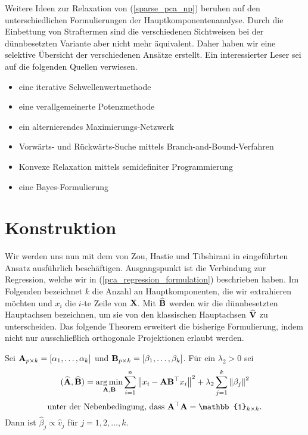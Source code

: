 Weitere Ideen zur Relaxation von (\ref{sparse_pca_np}) beruhen auf den unterschiedlichen Formulierungen der Hauptkomponentenanalyse. Durch die Einbettung von Straftermen sind die verschiedenen Sichtweisen bei der dünnbesetzten Variante aber nicht mehr äquivalent. Daher haben wir eine selektive Übersicht der verschiedenen Ansätze erstellt. Ein interessierter Leser sei auf die folgenden Quellen verwiesen.
\begin{itemize}
\item eine iterative Schwellenwertmethode \cite{shen, witten}
\item eine verallgemeinerte Potenzmethode \cite{journee}
\item ein alternierendes Maximierungs-Netzwerk \cite{richtarik}
\item Vorwärts- und Rückwärts-Suche mittels Branch-and-Bound-Verfahren \cite{moghaddam}
\item Konvexe Relaxation mittels semidefiniter Programmierung \cite{daspremont_semidefinite}
\item eine Bayes-Formulierung \cite{guan}
\end{itemize}




\section{Konstruktion}
\label{construction}

Wir werden uns nun mit dem von Zou, Hastie und Tibshirani in \cite{zou_sparsepca} eingeführten Ansatz ausführlich beschäftigen. Ausgangspunkt ist die Verbindung zur Regression, welche wir in (\ref{pca_regression_formulation}) beschrieben haben. Im Folgenden bezeichnet $k$ die Anzahl an Hauptkomponenten, die wir extrahieren möchten und $x_i$ die $i$-te Zeile von $\mathbf{X}$. Mit $\widehat{\mathbf{B}}$ werden wir die dünnbesetzten Hauptachsen bezeichnen, um sie von den klassischen Hauptachsen $\widehat{\mathbf{V}}$ zu unterscheiden. Das folgende Theorem erweitert die bisherige Formulierung, indem nicht nur ausschließlich orthogonale Projektionen erlaubt werden. 

\begin{thm} \label{pca_regression_formulation_ridge}
Sei $\mathbf{A}_{p \times k} = [ \alpha_1, \ldots ,\alpha_k ]$ und $\mathbf{B}_{p \times k} = [ \beta_1, \ldots ,\beta_k ]$. Für ein $\lambda_2 > 0$ sei
$$(\widehat{\mathbf{A}}, \widehat{\mathbf{B}}) = \operatorname*{arg\,min}_{\mathbf{A}, \mathbf{B}} \sum_{i=1}^{n} \left\lVert x_i - \mathbf{A}\mathbf{B}^{\top}x_i \right\rVert^2 + \lambda_2 \sum_{j=1}^{k}\left\lVert \beta_j \right\rVert^2$$
$$\text{unter der Nebenbedingung, dass } \mat{A}^{\top}\mat{A} = \mat{\mathbb{1}}_{k \times k}.$$
Dann ist $\widehat{\beta}_j \propto \widehat{v}_j$ für $j = 1,2,\ldots,k$. 
\end{thm}

